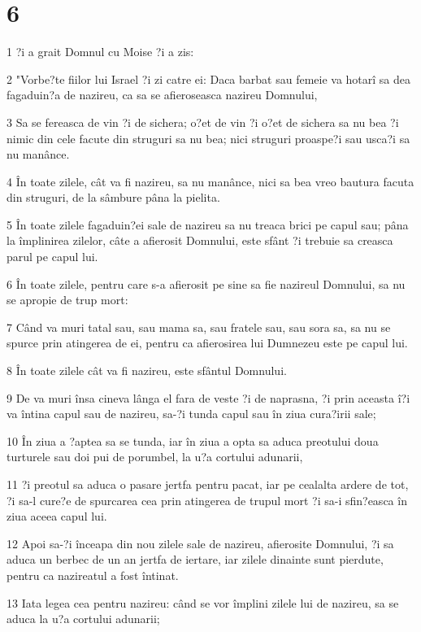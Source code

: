 \chapter{6}

\par 1 ?i a grait Domnul cu Moise ?i a zis:
\par 2 "Vorbe?te fiilor lui Israel ?i zi catre ei: Daca barbat sau femeie va hotarî sa dea fagaduin?a de nazireu, ca sa se afieroseasca nazireu Domnului,
\par 3 Sa se fereasca de vin ?i de sichera; o?et de vin ?i o?et de sichera sa nu bea ?i nimic din cele facute din struguri sa nu bea; nici struguri proaspe?i sau usca?i sa nu manânce.
\par 4 În toate zilele, cât va fi nazireu, sa nu manânce, nici sa bea vreo bautura facuta din struguri, de la sâmbure pâna la pielita.
\par 5 În toate zilele fagaduin?ei sale de nazireu sa nu treaca brici pe capul sau; pâna la împlinirea zilelor, câte a afierosit Domnului, este sfânt ?i trebuie sa creasca parul pe capul lui.
\par 6 În toate zilele, pentru care s-a afierosit pe sine sa fie nazireul Domnului, sa nu se apropie de trup mort:
\par 7 Când va muri tatal sau, sau mama sa, sau fratele sau, sau sora sa, sa nu se spurce prin atingerea de ei, pentru ca afierosirea lui Dumnezeu este pe capul lui.
\par 8 În toate zilele cât va fi nazireu, este sfântul Domnului.
\par 9 De va muri însa cineva lânga el fara de veste ?i de naprasna, ?i prin aceasta î?i va întina capul sau de nazireu, sa-?i tunda capul sau în ziua cura?irii sale;
\par 10 În ziua a ?aptea sa se tunda, iar în ziua a opta sa aduca preotului doua turturele sau doi pui de porumbel, la u?a cortului adunarii,
\par 11 ?i preotul sa aduca o pasare jertfa pentru pacat, iar pe cealalta ardere de tot, ?i sa-l cure?e de spurcarea cea prin atingerea de trupul mort ?i sa-i sfin?easca în ziua aceea capul lui.
\par 12 Apoi sa-?i înceapa din nou zilele sale de nazireu, afierosite Domnului, ?i sa aduca un berbec de un an jertfa de iertare, iar zilele dinainte sunt pierdute, pentru ca nazireatul a fost întinat.
\par 13 Iata legea cea pentru nazireu: când se vor împlini zilele lui de nazireu, sa se aduca la u?a cortului adunarii;
